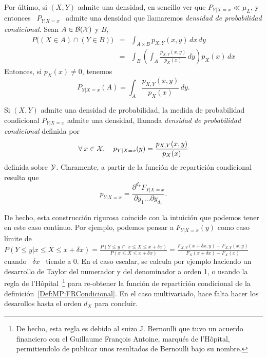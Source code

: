 Por \'ultimo, si $(X,Y)$ admite una  densidad, en sencillo ver  que $P_{Y|X=x} \ll
\mu_L$,  y entonces  \ $P_{Y|X=x}$  \ admite  una densidad  que  llamaremos {\it
  densidad de probabilidad condicional}. Sean $A \in \mathcal{B}(\mathcal{X})$ y $B$,
%
\begin{eqnarray*}
P\Big( (X \in A) \cap (Y \in B) \Big) & = & \int_{A \times B} p_{X,Y}(x,y) \, dx \, dy\\[2mm]
%
& = & \int_B \left( \int_A \frac{p_{X,Y}(x,y)}{p_X(x)} \, dy \right) p_X(x) \, dx
\end{eqnarray*}
%
Entonces, si $p_X(x) \ne 0$, tenemos
%
\[
P_{Y|X=x}(A) = \int_A \frac{p_{X,Y}(x,y)}{p_X(x)} \, dy.
\]
%
\begin{teorema}
\label{Def:MP:DensidadCondicional}
%
  Si  $(X,Y)$ admite  una densidad  de probabilidad,  la medida  de probabilidad
  condicional  $P_{Y|X=x}$  admite  una   densidad,  llamada  {\it  densidad  de
    probabilidad condicional} definida por
  \[
  \forall \: x \in \mathcal{X}, \quad p_{Y|X=x}(y) = \frac{p_{X,Y}(x,y)}{p_X(x)}
  \]
  definida  sobre $\mathcal{Y}$. Claramente,  a partir de  la funci\'on  de repartici\'on
  condicional resulta que
  \[
  p_{Y|X=x} = \frac{\partial^{d_Y}  F_{Y|X=x}}{\partial y_1 \ldots \partial y_{d_Y}}.
  \]
\end{teorema}

De hecho, esta  construcci\'on rigurosa coincide con la  intuici\'on que podemos
tener en este  caso continuo. Por ejemplo, podemos  pensar a $F_{Y|X=x}(y)$ como
caso l\'imite de $P(\left. Y \le y \right|  x \le X \le x+\delta x) = \frac{P( Y
  \le  y \:  \cap \:  x \le  X \le  x+\delta x)}{P(x  \le X  \le x+\delta  x)} =
\frac{F_{X,Y}(x+\delta  x ,  y) -  F_{X,Y}(x  , y)}{F_X(x+\delta  x) -  F_X(x)}$
cuando \ $\delta  x$ \ tiende a 0.   En el caso escalar, se  calcula por ejemplo
haciendo un  desarrollo de Taylor del numerador  y del denominador a  orden 1, o
usando la regla de l'H\^opital~\footnote{De hecho, esta regla es debido al suizo
  J.  Bernoulli  que tuvo  un acuerdo financiero  con el  Guillaume Fran\c{c}ois
  Antoine, marqu\'es  de l'H\^opital, permitiendolo de  publicar unos resultados
  de Bernoulli bajo  su nombre.}  para re-obtener la  funci\'on de repartici\'on
condicional   de   la   definici\'on~\ref{Def:MP:FRCondicional}.  En   el   caso
multivariado,  hace  falta  hacer  los  desarollos hasta  el  orden  $d_X$  para
concluir.

